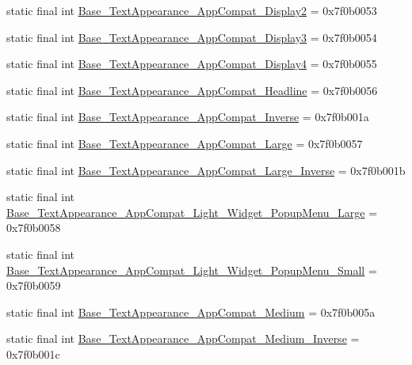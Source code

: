 \begin{CompactItemize}
\item 
static final int \hyperlink{classandroid_1_1support_1_1graphics_1_1drawable_1_1animated_1_1_r_1_1style_1acd5db110e3d0deba62c843dad50914}{Base\_\-TextAppearance\_\-AppCompat\_\-Display2} = 0x7f0b0053
\item 
static final int \hyperlink{classandroid_1_1support_1_1graphics_1_1drawable_1_1animated_1_1_r_1_1style_7c64c5b34fe4e4890f97e94206f5384a}{Base\_\-TextAppearance\_\-AppCompat\_\-Display3} = 0x7f0b0054
\item 
static final int \hyperlink{classandroid_1_1support_1_1graphics_1_1drawable_1_1animated_1_1_r_1_1style_74989683ab28f51d2abebafe85c4216c}{Base\_\-TextAppearance\_\-AppCompat\_\-Display4} = 0x7f0b0055
\item 
static final int \hyperlink{classandroid_1_1support_1_1graphics_1_1drawable_1_1animated_1_1_r_1_1style_f2f9452311d4cbc2c567639730a5b77d}{Base\_\-TextAppearance\_\-AppCompat\_\-Headline} = 0x7f0b0056
\item 
static final int \hyperlink{classandroid_1_1support_1_1graphics_1_1drawable_1_1animated_1_1_r_1_1style_ea1c152f9eba346531bc91f395c8d1bf}{Base\_\-TextAppearance\_\-AppCompat\_\-Inverse} = 0x7f0b001a
\item 
static final int \hyperlink{classandroid_1_1support_1_1graphics_1_1drawable_1_1animated_1_1_r_1_1style_e2fcb0e64494dc84d51847a2045f6375}{Base\_\-TextAppearance\_\-AppCompat\_\-Large} = 0x7f0b0057
\item 
static final int \hyperlink{classandroid_1_1support_1_1graphics_1_1drawable_1_1animated_1_1_r_1_1style_c4b3a4577b5f0fdb5357c0a46edc804b}{Base\_\-TextAppearance\_\-AppCompat\_\-Large\_\-Inverse} = 0x7f0b001b
\item 
static final int \hyperlink{classandroid_1_1support_1_1graphics_1_1drawable_1_1animated_1_1_r_1_1style_45d4690c37f6668b45505afb65db3d5e}{Base\_\-TextAppearance\_\-AppCompat\_\-Light\_\-Widget\_\-PopupMenu\_\-Large} = 0x7f0b0058
\item 
static final int \hyperlink{classandroid_1_1support_1_1graphics_1_1drawable_1_1animated_1_1_r_1_1style_d52e12a175a154d8d68bbf1ba597ddcd}{Base\_\-TextAppearance\_\-AppCompat\_\-Light\_\-Widget\_\-PopupMenu\_\-Small} = 0x7f0b0059
\item 
static final int \hyperlink{classandroid_1_1support_1_1graphics_1_1drawable_1_1animated_1_1_r_1_1style_3393702a0f9da0da939673a6073877af}{Base\_\-TextAppearance\_\-AppCompat\_\-Medium} = 0x7f0b005a
\item 
static final int \hyperlink{classandroid_1_1support_1_1graphics_1_1drawable_1_1animated_1_1_r_1_1style_7ffafedad37fdb090e0b23a8b41067bd}{Base\_\-TextAppearance\_\-AppCompat\_\-Medium\_\-Inverse} = 0x7f0b001c

\end{CompactItemize}

